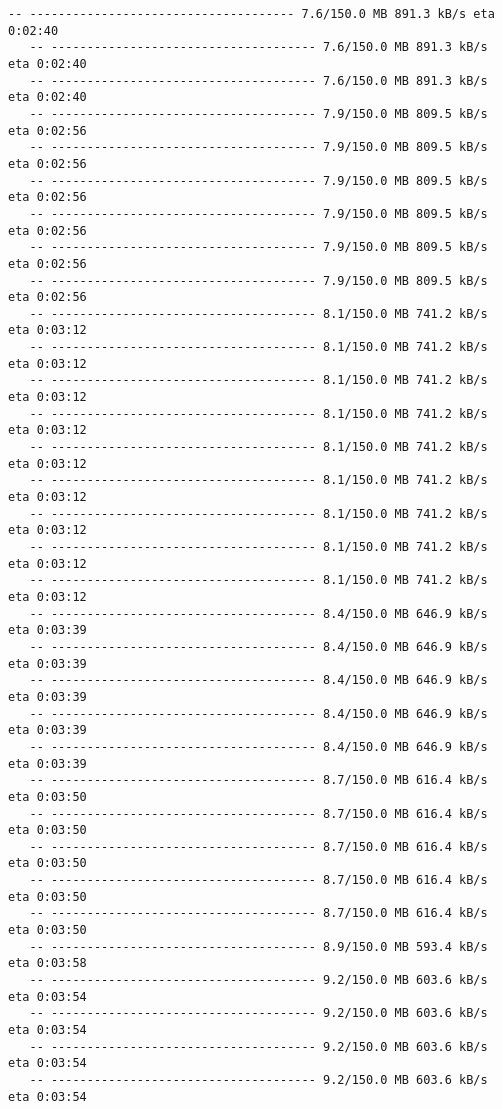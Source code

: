 \documentclass[11pt]{article}
\begin{document}
\begin{Verbatim}[commandchars=\\\{\}]
   -- ------------------------------------- 7.6/150.0 MB 891.3 kB/s eta 0:02:40
   -- ------------------------------------- 7.6/150.0 MB 891.3 kB/s eta 0:02:40
   -- ------------------------------------- 7.6/150.0 MB 891.3 kB/s eta 0:02:40
   -- ------------------------------------- 7.9/150.0 MB 809.5 kB/s eta 0:02:56
   -- ------------------------------------- 7.9/150.0 MB 809.5 kB/s eta 0:02:56
   -- ------------------------------------- 7.9/150.0 MB 809.5 kB/s eta 0:02:56
   -- ------------------------------------- 7.9/150.0 MB 809.5 kB/s eta 0:02:56
   -- ------------------------------------- 7.9/150.0 MB 809.5 kB/s eta 0:02:56
   -- ------------------------------------- 7.9/150.0 MB 809.5 kB/s eta 0:02:56
   -- ------------------------------------- 8.1/150.0 MB 741.2 kB/s eta 0:03:12
   -- ------------------------------------- 8.1/150.0 MB 741.2 kB/s eta 0:03:12
   -- ------------------------------------- 8.1/150.0 MB 741.2 kB/s eta 0:03:12
   -- ------------------------------------- 8.1/150.0 MB 741.2 kB/s eta 0:03:12
   -- ------------------------------------- 8.1/150.0 MB 741.2 kB/s eta 0:03:12
   -- ------------------------------------- 8.1/150.0 MB 741.2 kB/s eta 0:03:12
   -- ------------------------------------- 8.1/150.0 MB 741.2 kB/s eta 0:03:12
   -- ------------------------------------- 8.1/150.0 MB 741.2 kB/s eta 0:03:12
   -- ------------------------------------- 8.1/150.0 MB 741.2 kB/s eta 0:03:12
   -- ------------------------------------- 8.4/150.0 MB 646.9 kB/s eta 0:03:39
   -- ------------------------------------- 8.4/150.0 MB 646.9 kB/s eta 0:03:39
   -- ------------------------------------- 8.4/150.0 MB 646.9 kB/s eta 0:03:39
   -- ------------------------------------- 8.4/150.0 MB 646.9 kB/s eta 0:03:39
   -- ------------------------------------- 8.4/150.0 MB 646.9 kB/s eta 0:03:39
   -- ------------------------------------- 8.7/150.0 MB 616.4 kB/s eta 0:03:50
   -- ------------------------------------- 8.7/150.0 MB 616.4 kB/s eta 0:03:50
   -- ------------------------------------- 8.7/150.0 MB 616.4 kB/s eta 0:03:50
   -- ------------------------------------- 8.7/150.0 MB 616.4 kB/s eta 0:03:50
   -- ------------------------------------- 8.7/150.0 MB 616.4 kB/s eta 0:03:50
   -- ------------------------------------- 8.9/150.0 MB 593.4 kB/s eta 0:03:58
   -- ------------------------------------- 9.2/150.0 MB 603.6 kB/s eta 0:03:54
   -- ------------------------------------- 9.2/150.0 MB 603.6 kB/s eta 0:03:54
   -- ------------------------------------- 9.2/150.0 MB 603.6 kB/s eta 0:03:54
   -- ------------------------------------- 9.2/150.0 MB 603.6 kB/s eta 0:03:54

\end{Verbatim}
\end{document}

